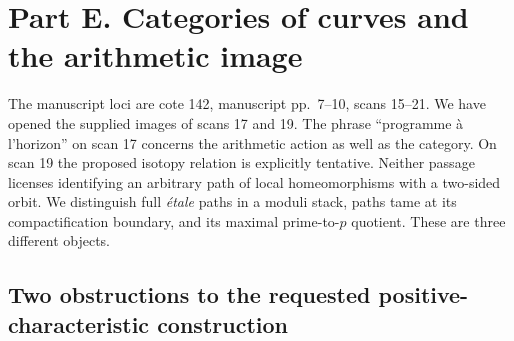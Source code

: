 \section{Part E. Categories of curves and the arithmetic image}

The manuscript loci are cote 142, manuscript pp.~7--10, scans
15--21. We have opened the supplied images of scans 17 and 19.
The phrase ``programme \`a l'horizon'' on scan 17 concerns the
arithmetic action as well as the category. On scan 19 the proposed
isotopy relation is explicitly tentative. Neither passage licenses
identifying an arbitrary path of local homeomorphisms with a
two-sided orbit. We distinguish full \emph{\'etale} paths in a moduli
stack, paths tame at its compactification boundary, and its maximal
prime-to-$p$ quotient. These are three different objects.

\subsection{Two obstructions to the requested positive-characteristic construction}

